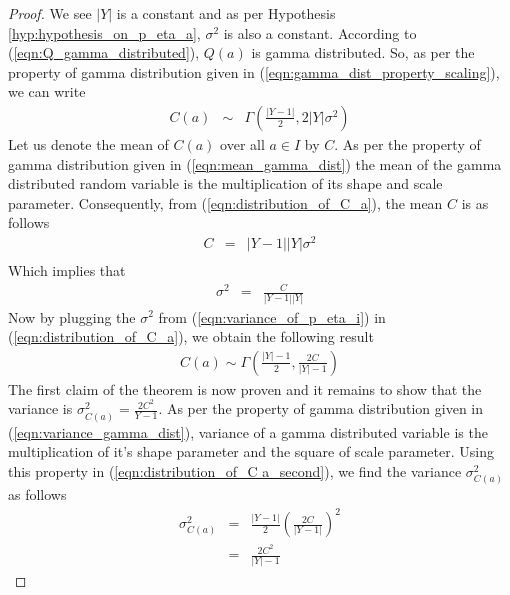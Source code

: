 \begin{proof}
We see $|Y|$ is a constant and as per Hypothesis \ref{hyp:hypothesis_on_p_eta_a}, $\sigma^2$ is also a constant. According to (\ref{eqn:Q_gamma_distributed}), $Q(a)$ is gamma distributed. So, as per the property of gamma distribution given in (\ref{eqn:gamma_dist_property_scaling}), we can write 
\begin{eqnarray} 
C(a) &\sim & \Gamma\left(\frac{|Y-1|}{2},2|Y|\sigma^{2}\right) \label{eqn:distribution_of_C_a}
\end{eqnarray}
Let us denote the mean of $C(a)$ over all $a \in I$ by $C$. As per the property of gamma distribution given in (\ref{eqn:mean_gamma_dist}) the mean of the gamma distributed random variable is the multiplication of its shape and scale parameter. Consequently, from (\ref{eqn:distribution_of_C_a}), the mean  $C$ is as follows
\begin{eqnarray*}
C &=& |Y-1||Y|\sigma^2\\
\end{eqnarray*} Which implies that
\begin{eqnarray}
\sigma^2 &=& \frac{C}{|Y-1||Y|} \label{eqn:variance_of_p_eta_i}
\end{eqnarray} 
Now by plugging the $\sigma^2$ from (\ref{eqn:variance_of_p_eta_i}) in (\ref{eqn:distribution_of_C_a}), we obtain the following result 
\begin{eqnarray}
C(a) \sim \Gamma\left(\frac{|Y|-1}{2},\frac{2C}{|Y|-1}\right) \label{eqn:distribution_of_C a_second}
\end{eqnarray}
The first claim of the theorem is now proven and it remains to show that the variance is $\sigma^2_{C(a)} = \frac{2C^2}{Y-1}$. As per the property of gamma distribution given in (\ref{eqn:variance_gamma_dist}), variance of a gamma distributed variable  is the multiplication of it's shape parameter and the square of scale parameter. Using this property in (\ref{eqn:distribution_of_C a_second}), we find the variance $\sigma^2_{C(a)}$ as follows 
\begin{eqnarray*}
\sigma^{2}_{C(a)} &=& \frac{|Y-1|}{2}\left(\frac{2C}{|Y-1|}\right)^2 \\ 
&=& \frac{2C^2}{|Y|-1}
\end{eqnarray*}
\end{proof}

